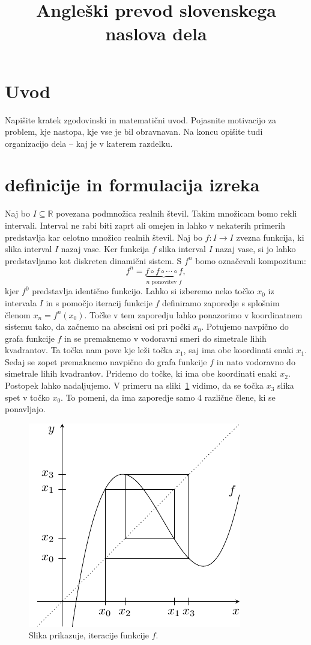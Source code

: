 \documentclass[mat2]{fmfdelo}
\title{Angleški prevod slovenskega naslova dela}
\newcommand{\R}{\mathbb R}
\begin{document}
\section{Uvod}
Napišite kratek zgodovinski in matematični uvod.  Pojasnite motivacijo za problem, kje
nastopa, kje vse je bil obravnavan. Na koncu opišite tudi organizacijo dela -- kaj je v
katerem razdelku.

\section{definicije in formulacija izreka}
Naj bo $I\subseteq \R$ povezana podmnožica realnih števil. Takim množicam bomo rekli intervali. Interval ne rabi biti zaprt ali omejen in lahko v nekaterih primerih predstavlja kar celotno množico realnih števil. Naj bo $f:I \to I$ zvezna funkcija, ki slika interval $I$ nazaj vase. Ker funkcija $f$ slika interval $I$ nazaj vase, si jo lahko predstavljamo kot diskreten dinamični sistem. S $f^n$ bomo označevali kompozitum:
$$f^n = \underbrace{f \circ f \circ \cdots \circ f}_{n \text{ ponovitev } f},$$
kjer $f^0$ predstavlja identično funkcijo. Lahko si izberemo neko točko $x_0$ iz intervala $I$ in s pomočjo iteracij funkcije $f$ definiramo zaporedje s splošnim členom $x_n = f^n(x_0)$. Točke v tem zaporedju lahko ponazorimo v koordinatnem sistemu tako, da začnemo na abscisni osi pri počki $x_0$. Potujemo navpično do grafa funkcije $f$ in se premaknemo v vodoravni smeri do simetrale lihih kvadrantov. Ta točka nam pove kje leži točka $x_1$, saj ima obe koordinati enaki $x_1$. Sedaj se zopet premaknemo navpično do grafa funkcije $f$ in nato vodoravno do simetrale lihih kvadrantov. Pridemo do točke, ki ima obe koordinati enaki $x_2$. Postopek lahko nadaljujemo. V primeru na sliki~\ref{fig:iteracije} vidimo, da se točka $x_3$ slika spet v točko $x_0$. To pomeni, da ima zaporedje samo 4 različne člene, ki se ponavljajo.

\begin{figure}[h]
  \centering
  \includegraphics[]{images/iteracije_f.pdf}
  \caption[Primer vektorske slike.]{Slika prikazuje, iteracije funkcije $f$.}
  \label{fig:iteracije}
\end{figure}
\end{document}
